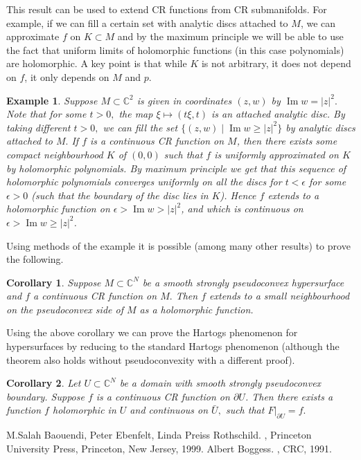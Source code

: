 \documentclass[12pt]{article}
\theoremstyle{theorem}
\newtheorem*{cor}{Corollary}
\newtheorem*{example}{Example}
\theoremstyle{definition}
\theoremstyle{remark}
\begin{document}
This result can be used to extend CR functions from CR submanifolds.  For example, if we can fill a certain set
with analytic discs attached to $M$, we can approximate $f$ on $K \subset M$ and by the maximum principle we will
be able to use the fact that uniform limits of holomorphic functions (in this case polynomials) are holomorphic.
A key point is that while $K$ is not arbitrary, it does not depend on $f$, it only depends on $M$ and $p$.

\begin{example}
Suppose $M \subset {\mathbb{C}}^2$ is given in coordinates $(z,w)$ by $\operatorname{Im} w = \lvert z \rvert^2 .$
Note that for
some $t > 0,$
the map $\xi \mapsto (t \xi, t)$ is an attached analytic disc.  By taking different $t > 0,$
we can fill the set $\{ (z,w) \mid \operatorname{Im} w \geq \lvert z \rvert^2 \}$ by analytic discs attached to $M.$
If $f$
is a continuous CR function on $M$, then there exists some compact neighbourhood $K$ of $(0,0)$ such that $f$
is uniformly approximated on $K$ by holomorphic polynomials.  By maximum principle we get that this sequence
of holomorphic polynomials converges uniformly on all the discs for $t < \epsilon$ for some $\epsilon > 0$ (such that the boundary of the disc lies in $K$).
Hence $f$ extends to a holomorphic function on $\epsilon > \operatorname{Im} w > \lvert z \rvert^2$, and which is
continuous on $\epsilon > \operatorname{Im} w \geq \lvert z \rvert^2$.
\end{example}

Using methods of the example it is possible (among many other results) to prove the following.

\begin{cor}
Suppose $M \subset {\mathbb{C}}^N$ be a smooth strongly pseudoconvex hypersurface and $f$ a continuous
CR function on $M.$  Then $f$ extends to a small neighbourhood on the pseudoconvex side of $M$ as a
holomorphic function.
\end{cor}

Using the above corollary we can prove the Hartogs phenomenon for hypersurfaces by reducing to the standard
Hartogs phenomenon (although the theorem also holds without pseudoconvexity with a different proof).

\begin{cor}
Let $U \subset {\mathbb{C}}^N$ be a domain with smooth strongly pseudoconvex boundary.
Suppose $f$ is a continuous CR function on $\partial U$.  Then there exists a function $f$
holomorphic in $U$ and continuous on $\bar{U},$ such that $F|_{\partial U} = f .$
\end{cor}

\begin{thebibliography}{9}
M.\@ Salah Baouendi,
Peter Ebenfelt,
Linda Preiss Rothschild.
{\em {}},
Princeton University Press,
Princeton, New Jersey, 1999.
Albert Boggess.
{\em {}},
CRC, 1991.
\end{thebibliography}
\end{document}
